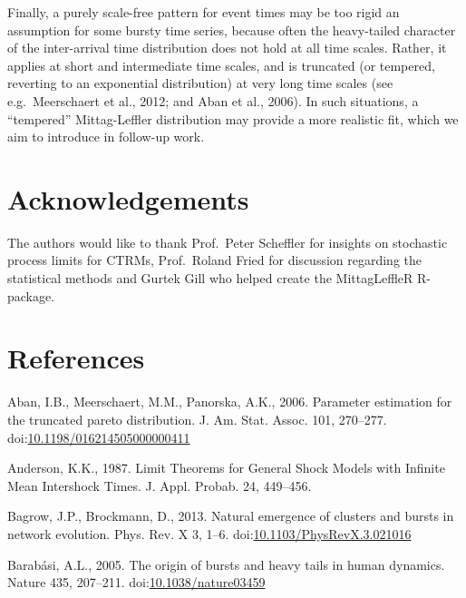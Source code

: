 \documentclass[]{elsarticle} %
\begin{document}
Finally, a purely scale-free pattern for event times may be too rigid an
assumption for some bursty time series, because often the heavy-tailed
character of the inter-arrival time distribution does not hold at all
time scales. Rather, it applies at short and intermediate time scales,
and is truncated (or tempered, reverting to an exponential distribution)
at very long time scales (see e.g.~Meerschaert et al., 2012; and Aban et
al., 2006). In such situations, a ``tempered'' Mittag-Leffler
distribution may provide a more realistic fit, which we aim to introduce
in follow-up work.

\hypertarget{acknowledgements}{%
\section*{Acknowledgements}\label{acknowledgements}}

The authors would like to thank Prof.~Peter Scheffler for insights on
stochastic process limits for CTRMs, Prof.~Roland Fried for discussion
regarding the statistical methods and Gurtek Gill who helped create the
MittagLeffleR R-package.

\newpage

\hypertarget{references}{%
\section*{References}\label{references}}

\hypertarget{refs}{}
\leavevmode\hypertarget{ref-Aban06}{}%
Aban, I.B., Meerschaert, M.M., Panorska, A.K., 2006. Parameter
estimation for the truncated pareto distribution. J. Am. Stat. Assoc.
101, 270--277.
doi:\href{https://doi.org/10.1198/016214505000000411}{10.1198/016214505000000411}

\leavevmode\hypertarget{ref-Anderson1987}{}%
Anderson, K.K., 1987. Limit Theorems for General Shock Models with
Infinite Mean Intershock Times. J. Appl. Probab. 24, 449--456.

\leavevmode\hypertarget{ref-Bagrow2013}{}%
Bagrow, J.P., Brockmann, D., 2013. Natural emergence of clusters and
bursts in network evolution. Phys. Rev. X 3, 1--6.
doi:\href{https://doi.org/10.1103/PhysRevX.3.021016}{10.1103/PhysRevX.3.021016}

\leavevmode\hypertarget{ref-Barabasi2005}{}%
Barabási, A.L., 2005. The origin of bursts and heavy tails in human
dynamics. Nature 435, 207--211.
doi:\href{https://doi.org/10.1038/nature03459}{10.1038/nature03459}
\end{document}
